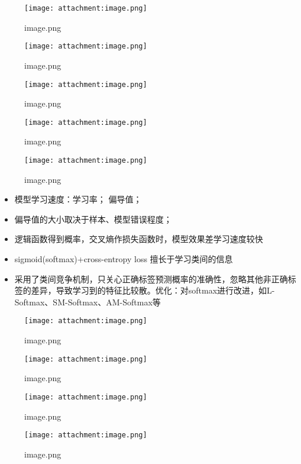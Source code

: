 \documentclass[11pt]{article}
\makeatletter
\def\maxwidth{\ifdim\Gin@nat@width>\linewidth\linewidth
    \else\Gin@nat@width\fi}
\let\Oldincludegraphics\includegraphics
\renewcommand{\includegraphics}[1]{\Oldincludegraphics[width=.8\maxwidth]{#1}}
\providecommand{\tightlist}{%
      \setlength{\itemsep}{0pt}\setlength{\parskip}{0pt}}
\makeatother
\begin{document}
    \begin{figure}
\centering
\texttt{[image: attachment:image.png]}
\caption{image.png}
\end{figure}

    \begin{figure}
\centering
\texttt{[image: attachment:image.png]}
\caption{image.png}
\end{figure}

    \begin{figure}
\centering
\texttt{[image: attachment:image.png]}
\caption{image.png}
\end{figure}

    \begin{figure}
\centering
\texttt{[image: attachment:image.png]}
\caption{image.png}
\end{figure}

    \begin{figure}
\centering
\texttt{[image: attachment:image.png]}
\caption{image.png}
\end{figure}

    \begin{itemize}
\tightlist
\item
  模型学习速度：学习率； 偏导值；
\item
  偏导值的大小取决于样本、模型错误程度；
\item
  逻辑函数得到概率，交叉熵作损失函数时，模型效果差学习速度较快
\item
  sigmoid(softmax)+cross-entropy loss 擅长于学习类间的信息
\item
  采用了类间竞争机制，只关心正确标签预测概率的准确性，忽略其他非正确标签的差异，导致学习到的特征比较散。优化：对softmax进行改进，如L-Softmax、SM-Softmax、AM-Softmax等
\end{itemize}

    \begin{figure}
\centering
\texttt{[image: attachment:image.png]}
\caption{image.png}
\end{figure}

    \begin{figure}
\centering
\texttt{[image: attachment:image.png]}
\caption{image.png}
\end{figure}

    \begin{figure}
\centering
\texttt{[image: attachment:image.png]}
\caption{image.png}
\end{figure}

    \begin{figure}
\centering
\texttt{[image: attachment:image.png]}
\caption{image.png}
\end{figure}
\end{document}
